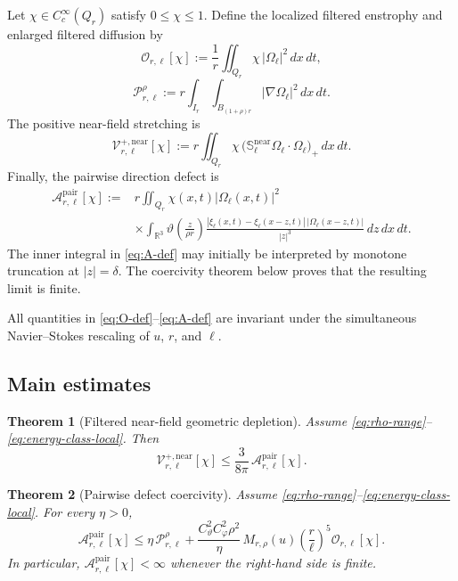 \documentclass[11pt]{article}
\numberwithin{equation}{section}
\theoremstyle{plain}
\newtheorem{theorem}{Theorem}[section]
\theoremstyle{definition}
\theoremstyle{remark}
\newcommand{\R}{\mathbb R}
\begin{document}
Let $\chi\in C_c^\infty(Q_r)$ satisfy $0\le\chi\le1$. Define the localized filtered enstrophy and enlarged filtered diffusion by
\begin{equation}\label{eq:O-def}
\mathcal O_{r,\ell}[\chi]
:=
\frac1r\iint_{Q_r}\chi\,|\Omega_\ell|^2\,dx\,dt,
\end{equation}
\begin{equation}\label{eq:P-def}
\mathcal P_{r,\ell}^{\rho}
:=
r\int_{I_r}\int_{B_{(1+\rho)r}}|\nabla\Omega_\ell|^2\,dx\,dt.
\end{equation}
The positive near-field stretching is
\begin{equation}\label{eq:V-near-def}
\mathcal V_{r,\ell}^{+,\mathrm{near}}[\chi]
:=
r\iint_{Q_r}\chi\,
\bigl(\mathbb S_\ell^{\mathrm{near}}\Omega_\ell\cdot\Omega_\ell\bigr)_+
\,dx\,dt.
\end{equation}
Finally, the pairwise direction defect is
\begin{align}
\mathcal A_{r,\ell}^{\mathrm{pair}}[\chi]
:= {}&
r\iint_{Q_r}\chi(x,t)|\Omega_\ell(x,t)|^2
\nonumber\\
&\times
\int_{\R^3}
\vartheta\!\left(\frac z{\rho r}\right)
\frac{
|\xi_\ell(x,t)-\xi_\ell(x-z,t)|\,
|\Omega_\ell(x-z,t)|
}{|z|^3}\,dz\,dx\,dt.
\label{eq:A-def}
\end{align}
The inner integral in \eqref{eq:A-def} may initially be interpreted by monotone truncation at $|z|=\delta$. The coercivity theorem below proves that the resulting limit is finite.

All quantities in \eqref{eq:O-def}--\eqref{eq:A-def} are invariant under the simultaneous Navier--Stokes rescaling of $u$, $r$, and $\ell$.

\subsection{Main estimates}

\begin{theorem}[Filtered near-field geometric depletion]\label{thm:geometric}
Assume \eqref{eq:rho-range}--\eqref{eq:energy-class-local}. Then
\begin{equation}\label{eq:geometric-main}
\mathcal V_{r,\ell}^{+,\mathrm{near}}[\chi]
\le
\frac{3}{8\pi}\,
\mathcal A_{r,\ell}^{\mathrm{pair}}[\chi].
\end{equation}
\end{theorem}

\begin{theorem}[Pairwise defect coercivity]\label{thm:coercivity}
Assume \eqref{eq:rho-range}--\eqref{eq:energy-class-local}. For every $\eta>0$,
\begin{equation}\label{eq:coercivity-main}
\mathcal A_{r,\ell}^{\mathrm{pair}}[\chi]
\le
\eta\,\mathcal P_{r,\ell}^{\rho}
+
\frac{C_\vartheta^2C_\varphi^2\rho^2}{\eta}\,
M_{r,\rho}(u)
\left(\frac r\ell\right)^5
\mathcal O_{r,\ell}[\chi].
\end{equation}
In particular, $\mathcal A_{r,\ell}^{\mathrm{pair}}[\chi]<\infty$ whenever the right-hand side is finite.
\end{theorem}
\end{document}
